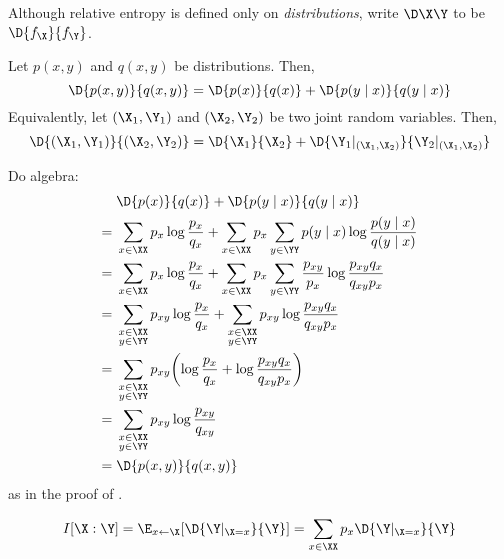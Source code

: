 \documentclass[class=co432,notes,tikz]{agony}
\begin{document}
\begin{notation}
  Although relative entropy is defined only on \emph{distributions},
  write $\D\X\Y$ to be $\D{f_{\X}}{f_{\Y}}$.
\end{notation}

\begin{theorem}\label{thm:chainD}
  Let $p(x,y)$ and $q(x,y)$ be distributions. Then,
  \[ \D{p(x,y)}{q(x,y)} = \D{p(x)}{q(x)} + \D{p(y \mid x)}{q(y \mid x)} \]
  Equivalently, let $(\X_1,\Y_1)$ and $(\X_2,\Y_2)$ be two joint random variables.
  Then,
  \[
    \D{(\X_1,\Y_1)}{(\X_2,\Y_2)}
    = \D{\X_1}{\X_2} + \D{\Y_1|_{(\X_1,\X_2)}}{\Y_2|_{(\X_1,\X_2)}}
  \]
\end{theorem}
\begin{prf}
  Do algebra:
  \begin{align*}
        & \D{p(x)}{q(x)} + \D{p(y \mid x)}{q(y \mid x)}                                                                                                \\
    ={} & \sum_{x\in\XX} p_x \log \frac{p_x}{q_x} + \sum_{x\in\XX}p_x\sum_{y\in\YY}p(y\mid x) \log\frac{p(y\mid x)}{q(y\mid x)}                        \\
    ={} & \sum_{x\in\XX} p_x \log \frac{p_x}{q_x} + \sum_{x\in\XX}p_x\sum_{y\in\YY}\frac{p_{xy}}{p_x} \log\frac{p_{xy}q_x}{q_{xy}p_x}                  \\
    ={} & \sum_{\substack{x\in\XX\br y\in\YY}} p_{xy} \log \frac{p_x}{q_x} + \sum_{\substack{x\in\XX\br y\in\YY}}p_{xy}\log\frac{p_{xy}q_x}{q_{xy}p_x} \\
    ={} & \sum_{\substack{x\in\XX\br y\in\YY}} p_{xy} \qty(\log \frac{p_x}{q_x} + \log\frac{p_{xy}q_x}{q_{xy}p_x})                                     \\
    ={} & \sum_{\substack{x\in\XX\br y\in\YY}} p_{xy} \log\frac{p_{xy}}{q_{xy}}                                                                        \\
    ={} & \D{p(x,y)}{q(x,y)}
  \end{align*}
  as in the proof of .
\end{prf}
\begin{fact}
  \[ I[\X : \Y] = \E_{x \gets \X}[\D{\Y|_{\X=x}}{\Y}] = \sum_{x\in\XX}p_x\D{\Y|_{\X=x}}{\Y} \]
\end{fact}
\end{document}
